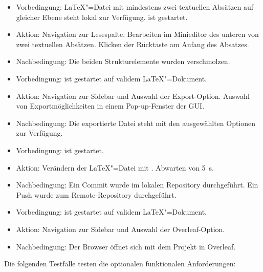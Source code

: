 \begin{itemize}
  \item Vorbedingung: \LaTeX"=Datei mit mindestens zwei textuellen Absätzen auf gleicher Ebene steht lokal zur
  Verfügung.
  \texla{} ist gestartet.
  \item Aktion: Navigation zur Lesespalte.
  Bearbeiten im Minieditor des unteren von zwei textuellen Absätzen.
  Klicken der Rücktaste am Anfang des Absatzes.
  \item Nachbedingung: Die beiden Strukturelemente wurden verschmolzen.
\end{itemize}

\clearpage

\begin{itemize}
  \item Vorbedingung: \texla{} ist gestartet auf validem \LaTeX"=Dokument.
  \item Aktion: Navigation zur Sidebar und Auswahl der Export-Option.
  Auswahl von Exportmöglichkeiten in einem Pop-up-Fenster der GUI.
  \item Nachbedingung: Die exportierte Datei steht mit den ausgewählten Optionen zur Verfügung.
\end{itemize}

\begin{itemize}
  \item Vorbedingung: \texla{} ist gestartet.
  \item Aktion: Verändern der \LaTeX"=Datei mit \texla{}.
  Abwarten von 5~\si{\second}.
  \item Nachbedingung: Ein Commit wurde im lokalen Repository durchgeführt.
  Ein Push wurde zum Remote-Repository durchgeführt.
\end{itemize}

\begin{itemize}
  \item Vorbedingung: \texla{} ist gestartet auf validem \LaTeX"=Dokument.
  \item Aktion: Navigation zur Sidebar und Auswahl der Overleaf-Option.
  \item Nachbedingung: Der Browser öffnet sich mit dem Projekt in Overleaf.
\end{itemize}

Die folgenden Testfälle testen die optionalen funktionalen Anforderungen:

